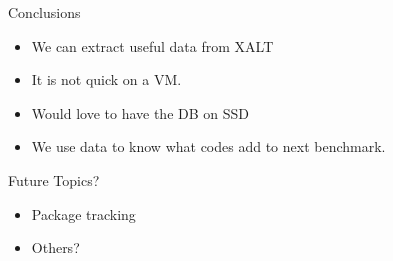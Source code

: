 \documentclass{beamer}
\begin{document}
\begin{frame}{Conclusions}
  \begin{itemize}
    \item We can extract useful data from XALT
    \item It is not quick on a VM.
    \item Would love to have the DB on SSD
    \item We use data to know what codes add to next benchmark.
  \end{itemize}
\end{frame}


\begin{frame}{Future Topics?} 
  \begin{itemize}
    \item Package tracking
    \item Others?
  \end{itemize}
\end{frame}
%

%
\end{document}
